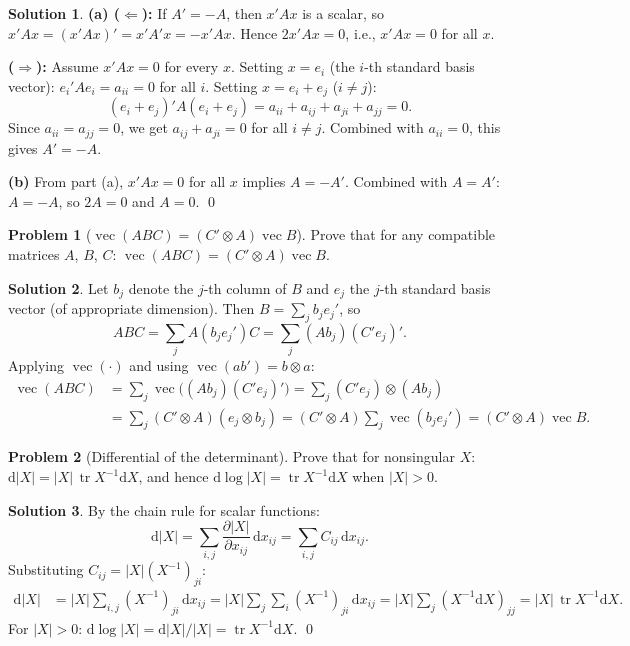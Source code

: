 \documentclass[12pt,a4paper]{article}
\theoremstyle{definition}
\newtheorem{exercise}{Problem}
\newtheorem*{solution*}{Solution}
\DeclareMathOperator\tr{tr}
\DeclareMathOperator{\avec}{vec}
\newcommand{\dd}{\mathrm{d}}
\begin{document}
\begin{solution*}
\textbf{(a) ($\Leftarrow$):} If $A' = -A$, then $x'Ax$ is a scalar, so $x'Ax = (x'Ax)' = x'A'x = -x'Ax$. Hence $2x'Ax = 0$, i.e., $x'Ax = 0$ for all $x$.

\textbf{($\Rightarrow$):} Assume $x'Ax = 0$ for every $x$. Setting $x = e_i$ (the $i$-th standard basis vector): $e_i'Ae_i = a_{ii} = 0$ for all $i$. Setting $x = e_i + e_j$ ($i \neq j$):
\[
(e_i + e_j)'A(e_i + e_j) = a_{ii} + a_{ij} + a_{ji} + a_{jj} = 0.
\]
Since $a_{ii} = a_{jj} = 0$, we get $a_{ij} + a_{ji} = 0$ for all $i \neq j$. Combined with $a_{ii} = 0$, this gives $A' = -A$.

\textbf{(b)} From part (a), $x'Ax = 0$ for all $x$ implies $A = -A'$. Combined with $A = A'$: $A = -A$, so $2A = 0$ and $A = 0$. \qed
\end{solution*}

\begin{exercise}[$\avec(ABC) = (C' \otimes A)\avec B$]\label{mc:A4}
Prove that for any compatible matrices $A$, $B$, $C$: $\avec(ABC) = (C' \otimes A)\avec B$.
\end{exercise}

\begin{solution*}
Let $b_j$ denote the $j$-th column of $B$ and $e_j$ the $j$-th standard basis vector (of appropriate dimension). Then $B = \sum_{j} b_j e_j'$, so
\[
ABC = \sum_{j} A(b_j e_j')C = \sum_{j} (Ab_j)(C'e_j)'.
\]
Applying $\avec(\cdot)$ and using $\avec(ab') = b \otimes a$:
\begin{align*}
\avec(ABC) &= \sum_{j} \avec\bigl((Ab_j)(C'e_j)'\bigr) = \sum_{j} (C'e_j) \otimes (Ab_j) \\
&= \sum_{j} (C' \otimes A)(e_j \otimes b_j) = (C' \otimes A) \sum_{j} \avec(b_j e_j') = (C' \otimes A)\avec B. \tag*{\qed}
\end{align*}
\end{solution*}

\begin{exercise}[Differential of the determinant]\label{mc:A5}
Prove that for nonsingular $X$: $\dd|X| = |X|\,\tr X^{-1}\dd X$, and hence $\dd\log|X| = \tr X^{-1}\dd X$ when $|X| > 0$.
\end{exercise}

\begin{solution*}
By the chain rule for scalar functions:
\[
\dd|X| = \sum_{i,j} \frac{\partial|X|}{\partial x_{ij}}\,\dd x_{ij} = \sum_{i,j} C_{ij}\,\dd x_{ij}.
\]
Substituting $C_{ij} = |X|(X^{-1})_{ji}$:
\begin{align*}
\dd|X| &= |X| \sum_{i,j} (X^{-1})_{ji}\,\dd x_{ij} = |X| \sum_{j} \sum_{i} (X^{-1})_{ji}\,\dd x_{ij} = |X| \sum_{j} (X^{-1}\dd X)_{jj} = |X|\,\tr X^{-1}\dd X.
\end{align*}
For $|X| > 0$: $\dd\log|X| = \dd|X|/|X| = \tr X^{-1}\dd X$. \qed
\end{solution*}
\end{document}
